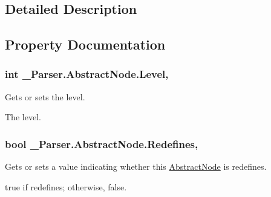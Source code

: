 \subsection{Detailed Description}




\subsection{Property Documentation}
\subsubsection[{\texorpdfstring{Level}{Level}}]{\setlength{\rightskip}{0pt plus 5cm}int \+\_\+Parser.\+Abstract\+Node.\+Level\hspace{0.3cm}{\ttfamily [get]}, {}}\hypertarget{class__1920_parser_1_1_abstract_node_a08c3c1dccbd57a5ddf4c6f2144223dc6}{}\label{class__1920_parser_1_1_abstract_node_a08c3c1dccbd57a5ddf4c6f2144223dc6}


Gets or sets the level. 

The level. 
\subsubsection[{\texorpdfstring{Redefines}{Redefines}}]{\setlength{\rightskip}{0pt plus 5cm}bool \+\_\+Parser.\+Abstract\+Node.\+Redefines\hspace{0.3cm}{\ttfamily [get]}, {}}\hypertarget{class__1920_parser_1_1_abstract_node_a66fd8845fa232c78f396f15467e17458}{}\label{class__1920_parser_1_1_abstract_node_a66fd8845fa232c78f396f15467e17458}


Gets or sets a value indicating whether this \hyperlink{class__1920_parser_1_1_abstract_node}{Abstract\+Node} is redefines. 

{\ttfamily true} if redefines; otherwise, {\ttfamily false}. 
